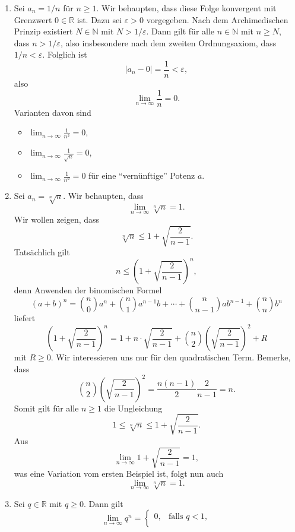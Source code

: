 \documentclass[../main.tex]{subfiles}
\begin{document}
\begin{examples}
  \leavevmode
\begin{enumerate}[(1)]
  \item Sei $a_n = 1/n$ für $n \geq 1$. Wir behaupten,
	  dass diese Folge konvergent mit Grenzwert
	  $0 \in \mathbb{R}$ ist. Dazu sei $\varepsilon > 0$
	  vorgegeben.
	  Nach dem Archimedischen Prinzip
	  existiert $N \in \mathbb{N}$ mit
	  $N > 1/\varepsilon$.
	  Dann gilt für alle $n \in \mathbb{N}$ mit $n \geq N$,
	  dass $n > 1/\varepsilon$, also insbesondere
	  nach dem zweiten Ordnungsaxiom, dass
	  $1/n < \varepsilon$.
	  Folglich ist
	  \[
		  |a_n - 0| = \frac{1}{n} < \varepsilon,
	  \]
	  also
	  \[
		  \lim_{n \to \infty}\frac{1}{n} = 0.
	  \]
	  Varianten davon sind
	  \begin{itemize}
	    \item $\lim_{n \to \infty} \frac{1}{n^2} = 0$,
	    \item $\lim_{n \to \infty} \frac{1}{\sqrt n} = 0$,
	    \item $\lim_{n \to \infty} \frac{1}{n^a} = 0$ für
		    eine ``vernünftige'' Potenz $a$.
	  \end{itemize}
  \item Sei $a_n = \sqrt[n]{n}$. Wir behaupten, dass
	  \[
		  \lim_{n \to \infty} \sqrt[n]{n} = 1.
	  \]
	  Wir wollen zeigen, dass 
	  \[
		  \sqrt[n]{n} \leq 1 + \sqrt{\frac{2}{n-1}}.
	  \]
	  Tatsächlich gilt
	  \[
		  n  \leq {\left( 1 + \sqrt{\frac{2}{n-1}} \right)}^n,
	  \]
	  denn Anwenden der binomischen Formel
	  \[
		  {(a + b)}^n = \binom{n}{0}a^n + \binom{n}{1}a^{n-1}b
		  + \cdots + \binom{n}{n-1}ab^{n-1} + \binom{n}{n}b^n
	  \]
	  liefert
	  \[
		  {\left( 1 + \sqrt{\frac{2}{n-1}} \right)}^n
		  = 1 + n \cdot \sqrt{\frac{2}{n-1}}
		  + \binom{n}{2} {\left( \sqrt{\frac{2}{n-1}} \right)}^2
		  + R
	  \]
	  mit $R \geq 0$.
    Wir interessieren uns nur für den 
    quadratischen Term.
    Bemerke, dass
    \[
      \binom{n}{2}{\left( \sqrt{\frac{2}{n-1}} \right)}^2
      = \frac{n(n-1)}{2} \frac{2}{n-1} = n.
    \]
	  Somit gilt für alle $n \geq 1$ die Ungleichung
	  \[
		  1 \leq \sqrt[n]{n} \leq 1 + \sqrt{\frac{2}{n-1}}.
	  \]
	  Aus
	  \[
		  \lim_{n \to \infty} 1 + \sqrt{\frac{2}{n-1}} = 1,
	  \]
    was eine Variation vom ersten Beispiel ist, folgt nun auch
	  \[
		  \lim_{n \to \infty} \sqrt[n]{n} = 1.
	  \]
  \item Sei $q \in \mathbb{R}$ mit $q \geq 0$. Dann gilt
	  \[
	    \lim_{n \to \infty} q^n = 
	    \begin{cases}
		    0, & \text{falls } q < 1, \\

\end{cases}\]
\end{enumerate}
\end{examples}
\end{document}
